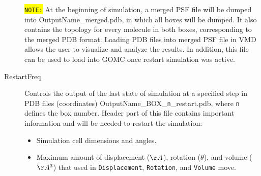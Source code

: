 \begin{description}
	\colorbox{yellow}{\texttt{NOTE:}} At the beginning of simulation, a merged PSF file will be dumped into OutputName\_merged.pdb, in which all boxes will be dumped. It also contains the topology for every molecule in both boxes, corresponding to the merged PDB format. Loading PDB files into merged PSF file in VMD allows the user to visualize and analyze the results. In addition, this file can be used to load into GOMC once restart simulation was active.
\item [RestartFreq] Controls the output of the last state of simulation at a specified step in PDB files (coordinates) OutputName\_BOX\_\texttt{n}\_restart.pdb, where \texttt{n} defines the box number. Header part of this file contains important information and will be needed to restart the simulation:
\begin{itemize}
	\item Simulation cell dimensions and angles.
	\item Maximum amount of displacement ($\AA$), rotation ($\theta$), and volume ($\AA^3$) that used in \texttt{Displacement}, \texttt{Rotation}, and \texttt{Volume} move. 
	\end{itemize}


\end{description}
